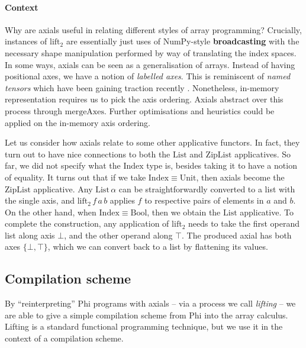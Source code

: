 \paragraph{Context} Why are axials useful in relating different styles of array programming? Crucially, instances of $\mathrm{lift}_2$ are essentially just uses of NumPy-style \textbf{broadcasting} with the necessary shape manipulation performed by way of translating the index spaces. In some ways, axials can be seen as a generalisation of arrays. Instead of having positional axes, we have a notion of \textit{labelled axes}. This is reminiscent of \textit{named tensors} which have been gaining traction recently \cite{chiang2022named}. Nonetheless, in-memory representation requires us to pick the axis ordering. Axials abstract over this process through $\mathrm{mergeAxes}$. Further optimisations and heuristics could be applied on the in-memory axis ordering.

Let us consider how axials relate to some other applicative functors. In fact, they turn out to have nice connections to both the $\mathrm{List}$ and $\mathrm{ZipList}$ applicatives. So far, we did not specify what the $\mathrm{Index}$ type is, besides taking it to have a notion of equality. It turns out that if we take $\mathrm{Index} \equiv \mathrm{Unit}$, then axials become the $\mathrm{ZipList}$ applicative. Any $\mathrm{List}\,\alpha$ can be straightforwardly converted to a list with the single axis, and $\mathrm{lift}_2\,f\,a\,b$ applies $f$ to respective pairs of elements in $a$ and $b$.
On the other hand, when $\mathrm{Index} \equiv \mathrm{Bool}$, then we obtain the $\mathrm{List}$ applicative. To complete the construction, any application of $\mathrm{lift}_2$ needs to take the first operand list along axis $\bot$, and the other operand along $\top$. The produced axial has both axes $\{ \bot, \top \}$, which we can convert back to a list by flattening its values.


\subsection{Compilation scheme}

By ``reinterpreting'' Phi programs with axials -- via a process we call \textit{lifting} -- we are able to give a simple compilation scheme from Phi into the array calculus. Lifting is a standard functional programming technique, but we use it in the context of a compilation scheme. 

\todothis

